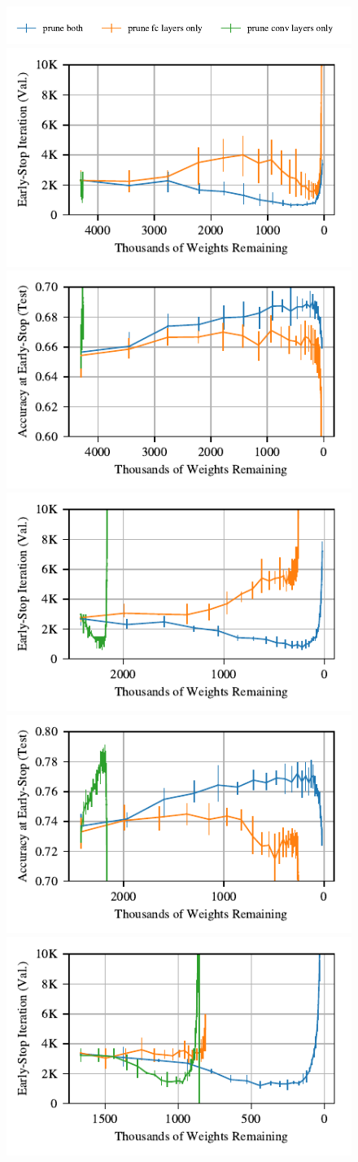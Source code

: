 \begin{figure}
\centering
\includegraphics[width=.6\textwidth]{graphs/cifar10/conv/conv_vs_fc1/legend}%
\vspace{-1em}
\includegraphics[width=.5\textwidth]{graphs/cifar10/conv/conv_vs_fc1/iteration}%
\includegraphics[width=.5\textwidth]{graphs/cifar10/conv/conv_vs_fc1/accuracy}
\includegraphics[width=.5\textwidth]{graphs/cifar10/conv/conv_vs_fc2/iteration}%
\includegraphics[width=.5\textwidth]{graphs/cifar10/conv/conv_vs_fc2/accuracy}
\includegraphics[width=.5\textwidth]{graphs/cifar10/conv/conv_vs_fc3/iteration}%

\end{figure}
